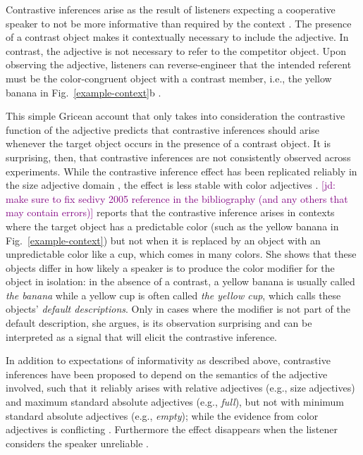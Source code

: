 \documentclass[10pt,letterpaper]{article}
\newcommand{\jd}[1]{\textcolor{Purple}{[jd: #1]}}
\newcommand{\figref}[1]{Fig.~\ref{#1}}
\begin{document}
Contrastive inferences arise as the result of listeners expecting a cooperative speaker to not be more informative than required by the context \cite{Grice:1975}. The presence of a contrast object makes it contextually necessary to include the adjective. In contrast, the adjective is not necessary to refer to the competitor object. Upon observing the adjective, listeners can reverse-engineer that the intended referent must be the color-congruent object with a contrast member, i.e., the yellow banana in \figref{example-context}b \cite{Aparicio:2018,Grodner:2011,Ryskin:2019,Sedivy:1999}.

This simple Gricean account that only takes into consideration the contrastive function of the adjective predicts that contrastive inferences should arise whenever the target object occurs in the presence of a contrast object. It is surprising, then, that contrastive inferences are not consistently observed across experiments. While the contrastive inference effect has been replicated reliably in the size adjective domain \cite{Aparicio:2018,Grodner:2011,Heller:2008,Ryskin:2019,Sedivy:1999}, the effect is less stable with color adjectives \cite{Sedivy:2003, Sedivy:2005}. \jd{make sure to fix sedivy 2005 reference in the bibliography (and any others that may contain errors)}  reports that the contrastive inference arises in contexts where the target object has a predictable color (such as the yellow banana in \figref{example-context}) but not when it is replaced by an object with an unpredictable color like a cup, which comes in many colors.
She shows that these objects differ in how likely a speaker is to produce the color modifier for the object in isolation: in the absence of a contrast, a yellow banana is usually called \textit{the banana} while a yellow cup is often called \textit{the yellow cup}, which  calls these objects' \emph{default descriptions}. Only in cases where the modifier is not part of the default description, she argues, is its observation surprising and can be interpreted as a signal that will elicit the contrastive inference.

In addition to expectations of informativity as described above, contrastive inferences have been proposed to depend on the semantics of the adjective involved, such that it reliably arises with relative adjectives (e.g., size adjectives) and maximum standard absolute adjectives (e.g., \textit{full}), but not with minimum standard absolute adjectives (e.g., \textit{empty}); while the evidence from color adjectives is conflicting \cite{Rubio-Fernandez:2019,Sedivy:2003}. Furthermore the effect disappears when the listener considers the speaker unreliable \cite{Grodner:2011,Ryskin:2019}.
\end{document}
